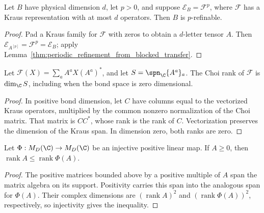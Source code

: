 \begin{lemma}
    \label{thm:periodic_refinement_from_bounded_root}
    \leanok
    Let $B$ have physical dimension $d$, let $p>0$, and suppose
    $\mathcal E_B=\mathcal F^p$, where $\mathcal F$ has a Kraus
    representation with at most $d$ operators. Then $B$ is $p$-refinable.
\end{lemma}

\begin{proof}\leanok
    Pad a Kraus family for $\mathcal F$ with zeros to obtain a
    $d$-letter tensor $A$. Then
    $\mathcal E_{A^{[p]}}=\mathcal F^p=\mathcal E_B$; apply
    Lemma~\ref{thm:periodic_refinement_from_blocked_transfer}.
\end{proof}

\begin{lemma}
    \label{thm:periodic_choi_rank_kraus_span}
    \leanok
    Let $\mathcal F(X)=\sum_a A^aX(A^a)^*$, and let
    $S=\spn_{\C}\{A^a\}_a$. The Choi rank of $\mathcal F$ is
    $\dim_{\C}S$, including when the bond space is zero dimensional.
\end{lemma}

\begin{proof}\leanok
    In positive bond dimension, let $C$ have columns equal to the
    vectorized Kraus operators, multiplied by the common nonzero
    normalization of the Choi matrix. That matrix is $CC^*$, whose rank
    is the rank of $C$. Vectorization preserves the dimension of the
    Kraus span. In dimension zero, both ranks are zero.
\end{proof}

\begin{lemma}
    \label{thm:periodic_injective_positive_rank}
    \leanok
    Let $\Phi:M_D(\C)\to M_D(\C)$ be an injective positive linear map.
    If $A\ge0$, then $\operatorname{rank}A\le\operatorname{rank}\Phi(A)$.
\end{lemma}

\begin{proof}\leanok
    The positive matrices bounded above by a positive multiple of $A$
    span the matrix algebra on its support. Positivity carries this span
    into the analogous span for $\Phi(A)$. Their complex dimensions are
    $(\operatorname{rank}A)^2$ and $(\operatorname{rank}\Phi(A))^2$,
    respectively, so injectivity gives the inequality.
\end{proof}

